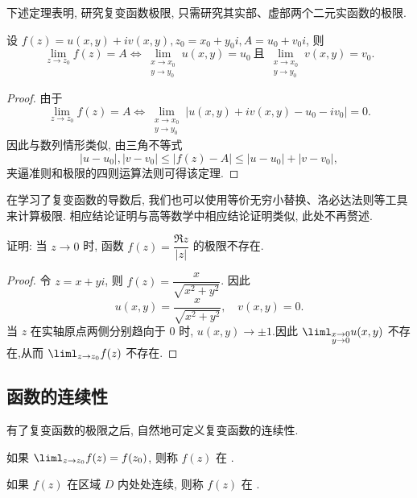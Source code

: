下述定理表明, 研究复变函数极限, 只需研究其实部、虚部两个二元实函数的极限.
\begin{theorem}\label{thm:limfunction}
  设 $f(z)=u(x,y)+iv(x,y),z_0=x_0+y_0i,A=u_0+v_0i$, 则
  \[
    \lim_{z\to z_0}f(z)=A\iff
    \lim_{\substack{x\to x_0\\y\to y_0}}u(x,y)=u_0\ \text{且}\ 
    \lim_{\substack{x\to x_0\\y\to y_0}}v(x,y)=v_0.
  \]
\end{theorem}

\begin{proof}
  由于
  \[
    \lim_{z\to z_0}f(z)=A\iff
    \lim_{\substack{x\to x_0\\y\to y_0}}|u(x,y)+iv(x,y)-u_0-iv_0|=0.
  \]
  因此与数列情形类似, 由三角不等式
  \[|u-u_0|,|v-v_0|\le|f(z)-A|\le|u-u_0|+|v-v_0|,\]
  夹逼准则和极限的四则运算法则可得该定理.
\end{proof}

在学习了复变函数的导数后, 我们也可以使用等价无穷小替换、洛必达法则等工具来计算极限. 相应结论证明与高等数学中相应结论证明类似, 此处不再赘述.

\begin{example}
  证明: 当 $z\to0$ 时, 函数 $f(z)=\dfrac{\Re z}{|z|}$ 的极限不存在.
\end{example}

\begin{proof}
  令 $z=x+yi$, 则 $f(z)=\dfrac x{\sqrt{x^2+y^2}}$.
  因此
    \[u(x,y)=\frac x{\sqrt{x^2+y^2}},\quad v(x,y)=0.\]
  当 $z$ 在实轴原点两侧分别趋向于 $0$ 时, $u(x,y)\to\pm1$.因此 $\liml_{\substack{x\to 0\\y\to0}}u(x,y)$ 不存在,从而 $\liml_{z\to z_0}f(z)$ 不存在.
\end{proof}


\subsection{函数的连续性}

有了复变函数的极限之后, 自然地可定义复变函数的连续性.
\begin{definition}
  \begin{enumpar}
    \item 如果 $\liml_{z\to z_0}f(z)=f(z_0)$, 则称 $f(z)$ 在 .
    \item 如果 $f(z)$ 在区域 $D$ 内处处连续, 则称 $f(z)$ 在 \nouns{$D$ 内连续}{连续}.
  \end{enumpar}
\end{definition}

